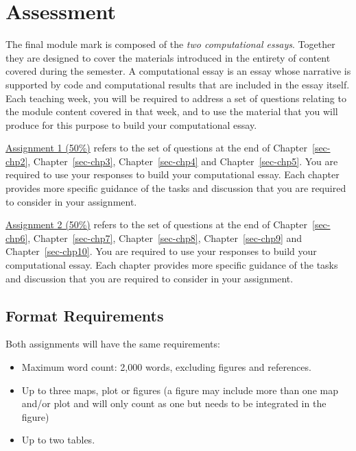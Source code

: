 \documentclass[
  letterpaper,
  DIV=11,
  numbers=noendperiod]{scrreprt}
\providecommand{\tightlist}{%
  \setlength{\itemsep}{0pt}\setlength{\parskip}{0pt}}\usepackage{longtable,booktabs,array}
\begin{document}
\hypertarget{assessment}{%
\section{Assessment}\label{assessment}}

The final module mark is composed of the \emph{two computational
essays}. Together they are designed to cover the materials introduced in
the entirety of content covered during the semester. A computational
essay is an essay whose narrative is supported by code and computational
results that are included in the essay itself. Each teaching week, you
will be required to address a set of questions relating to the module
content covered in that week, and to use the material that you will
produce for this purpose to build your computational essay.

\ul{Assignment 1 (50\%)} refers to the set of questions at the end of
Chapter~\ref{sec-chp2}, Chapter~\ref{sec-chp3}, Chapter~\ref{sec-chp4}
and Chapter~\ref{sec-chp5}. You are required to use your responses to
build your computational essay. Each chapter provides more specific
guidance of the tasks and discussion that you are required to consider
in your assignment.

\ul{Assignment 2 (50\%)} refers to the set of questions at the end of
Chapter~\ref{sec-chp6}, Chapter~\ref{sec-chp7}, Chapter~\ref{sec-chp8},
Chapter~\ref{sec-chp9} and Chapter~\ref{sec-chp10}. You are required to
use your responses to build your computational essay. Each chapter
provides more specific guidance of the tasks and discussion that you are
required to consider in your assignment.

\hypertarget{format-requirements}{%
\subsection{Format Requirements}\label{format-requirements}}

Both assignments will have the same requirements:

\begin{itemize}
\tightlist
\item
  Maximum word count: 2,000 words, excluding figures and references.
\item
  Up to three maps, plot or figures (a figure may include more than one
  map and/or plot and will only count as one but needs to be integrated
  in the figure)
\item
  Up to two tables.
\end{itemize}
\end{document}
